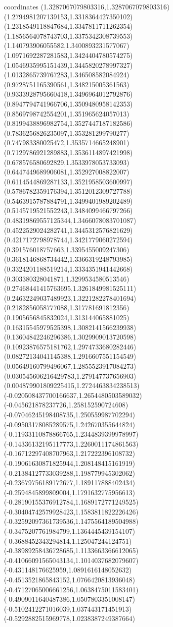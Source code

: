 coordinates {%
(1.3287067079803316,1.3287067079803316)
(1.2794981207139153,1.3318364427350102)
(1.2318549118847684,1.3347811711262354)
(1.1856564078743703,1.3375342308739553)
(1.140793906055582,1.3400893231577067)
(1.0971692287281583,1.3424404780574275)
(1.0546935995151439,1.3445820278997327)
(1.0132865739767283,1.346508582084924)
(0.9728751165390561,1.348215005361563)
(0.9333928795660418,1.3496964012792876)
(0.8947794741966706,1.3509480958142353)
(0.8569798742554201,1.351965624057013)
(0.8199438896982754,1.3527447187182586)
(0.7836256826235097,1.353281299790277)
(0.747983380025472,1.3535714665248901)
(0.7129786921289883,1.3536114897421998)
(0.678576580692829,1.3533978053733093)
(0.6447449689906081,1.352927008822007)
(0.6114544869287133,1.3521958503600997)
(0.5786782359176394,1.3512012309727788)
(0.5463915787884791,1.3499401989202489)
(0.5145719521552243,1.3484099466797266)
(0.48319869557125344,1.3466078083701087)
(0.4522529024282741,1.3445312576821629)
(0.4217172798978744,1.3421779060272594)
(0.391576018757663,1.3395455009247306)
(0.3618146868734442,1.3366319248793985)
(0.3324201188519214,1.3334351941442668)
(0.303380328041871,1.3299534580513546)
(0.27468441415763695,1.3261849981525111)
(0.24632249037489923,1.3221282278401694)
(0.2182856058777088,1.317781691812356)
(0.1905656845832024,1.313144065881025)
(0.16315545979525398,1.3082141566239938)
(0.13604842246296386,1.3029909013720598)
(0.10923876575181762,1.2974733680282446)
(0.08272134041145388,1.2916607551154549)
(0.05649160799496067,1.2855523917084273)
(0.030545606216429783,1.279147737656903)
(0.004879901809225415,1.2724463834238513)
(-0.020508437700166637,1.2654480503589032)
(-0.045621878237726,1.258152590724608)
(-0.07046245198408735,1.250559987702294)
(-0.09503178085289575,1.242670355644824)
(-0.11933110878866765,1.2344839399978997)
(-0.14336132195117773,1.2260011174861563)
(-0.16712297408707963,1.217222396108732)
(-0.19061630871825944,1.208148415161919)
(-0.21384127733039288,1.198779945302062)
(-0.23679756189172677,1.189117888402434)
(-0.2594845899809004,1.1791632775956613)
(-0.28190155376912784,1.1689172771249525)
(-0.30404742579928423,1.1583811822226426)
(-0.32592097361739536,1.1475564189504988)
(-0.3475207761984799,1.1364445439154107)
(-0.3688452343294814,1.125047244124751)
(-0.38989258436728685,1.1133663366612065)
(-0.41066091565043134,1.1014037682079607)
(-0.431148176625959,1.0891616148052632)
(-0.4513521865843152,1.0766420813936048)
(-0.47127065006661256,1.0638475011583401)
(-0.4909011640487386,1.0507803351008147)
(-0.5102412271016039,1.037443171451913)
(-0.5292882515969778,1.0238387249387664)
}
